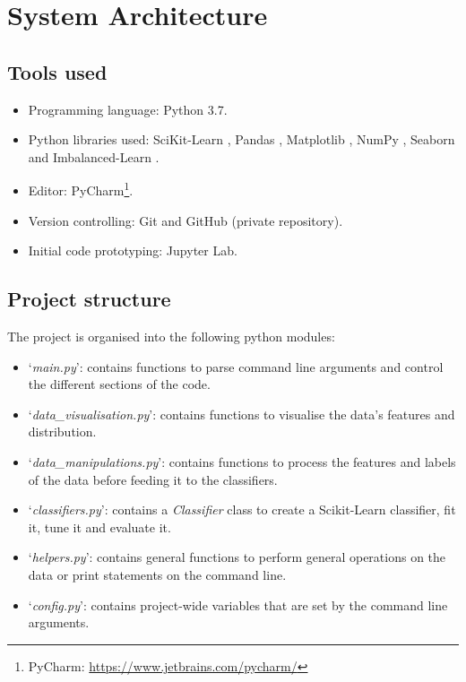 \documentclass[letterpaper,12pt]{article}
\begin{document}
\section{System Architecture}
\label{sec:system-architecture}

\subsection{Tools used}

\begin{itemize}
    \item Programming language: Python 3.7.
    \item Python libraries used: SciKit-Learn \cite{scikit-learn}, Pandas \cite{reback2020pandas}, Matplotlib \cite{Hunter:2007}, NumPy \cite{numpy},  Seaborn \cite{seaborn} and Imbalanced-Learn \cite{JMLR:v18:16-365}.
    \item Editor: PyCharm\footnote{PyCharm: \url{https://www.jetbrains.com/pycharm/}}.
    \item Version controlling: Git and GitHub (private repository).
    \item Initial code prototyping: Jupyter Lab.
\end{itemize}

\subsection{Project structure}

The project is organised into the following python modules:
\begin{itemize}
    \item `\textit{main.py}': contains functions to parse command line arguments and control the different sections of the code.
    \item `\textit{data\_visualisation.py}': contains functions to visualise the data's features and distribution.
    \item `\textit{data\_manipulations.py}': contains functions to process the features and labels of the data before feeding it to the classifiers.
    \item `\textit{classifiers.py}': contains a \textit{Classifier} class to create a Scikit-Learn classifier, fit it, tune it and evaluate it.
    \item `\textit{helpers.py}': contains general functions to perform general operations on the data or print statements on the command line.
    \item `\textit{config.py}': contains project-wide variables that are set by the command line arguments.
\end{itemize}
\end{document}
